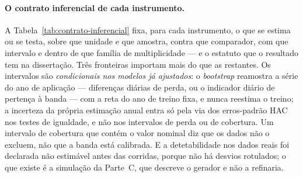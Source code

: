 \paragraph{O contrato inferencial de cada instrumento.} A
Tabela~\ref{tab:contrato-inferencial} fixa, para cada instrumento, o que
se estima ou se testa, sobre que unidade e que amostra, contra que
comparador, com que intervalo e dentro de que família de multiplicidade
--- e o estatuto que o resultado tem na dissertação. Três fronteiras
importam mais do que as restantes. Os intervalos são \emph{condicionais
nos modelos já ajustados}: o \emph{bootstrap} reamostra a série do ano de
aplicação --- diferenças diárias de perda, ou o indicador diário de
pertença à banda --- com a reta do ano de treino fixa, e nunca reestima o
treino; a incerteza da própria estimação anual entra só pela via dos
erros-padrão HAC nos testes de igualdade, e não nos intervalos de perda ou
de cobertura. Um intervalo de cobertura que contém o valor nominal diz que
os dados não o excluem, não que a banda está calibrada. E a detetabilidade
nos dados reais foi declarada não estimável antes das corridas, porque não
há desvios rotulados; o que existe é a simulação da Parte~C, que descreve o
gerador e não a refinaria.

